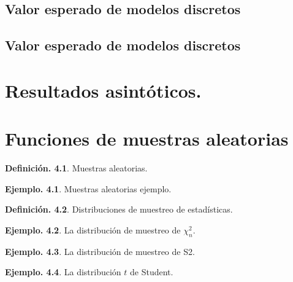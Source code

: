 \documentclass[]{book}
\theoremstyle{definition}
\newtheorem{definition}{Definición.}[chapter]
\theoremstyle{definition}
\newtheorem{example}{Ejemplo.}[chapter]
\theoremstyle{definition}
\theoremstyle{remark}
\begin{document}
\hypertarget{valor-esperado-de-modelos-discretos}{%
\section{Valor esperado de modelos discretos}\label{valor-esperado-de-modelos-discretos}}

\hypertarget{valor-esperado-de-modelos-discretos-1}{%
\section{Valor esperado de modelos discretos}\label{valor-esperado-de-modelos-discretos-1}}

\hypertarget{ass}{%
\chapter{Resultados asintóticos.}\label{ass}}

\hypertarget{xmuestras}{%
\chapter{Funciones de muestras aleatorias}\label{xmuestras}}

\begin{definition}
\protect\hypertarget{def:unnamed-chunk-129}{}{\label{def:unnamed-chunk-129} }Muestras aleatorias.
\end{definition}

\begin{example}
\protect\hypertarget{exm:unnamed-chunk-130}{}{\label{exm:unnamed-chunk-130} }
Muestras aleatorias ejemplo.
\end{example}

\begin{definition}
\protect\hypertarget{def:unnamed-chunk-131}{}{\label{def:unnamed-chunk-131} }
Distribuciones de muestreo de estadísticas.
\end{definition}

\begin{example}
\protect\hypertarget{exm:unnamed-chunk-132}{}{\label{exm:unnamed-chunk-132} }La distribución de muestreo de \(\chi_n^2\).
\end{example}

\begin{example}
\protect\hypertarget{exm:unnamed-chunk-133}{}{\label{exm:unnamed-chunk-133} }
La distribución de muestreo de S2.
\end{example}

\begin{example}
\protect\hypertarget{exm:unnamed-chunk-134}{}{\label{exm:unnamed-chunk-134} }
La distribución \(t\) de Student.
\end{example}
\end{document}
